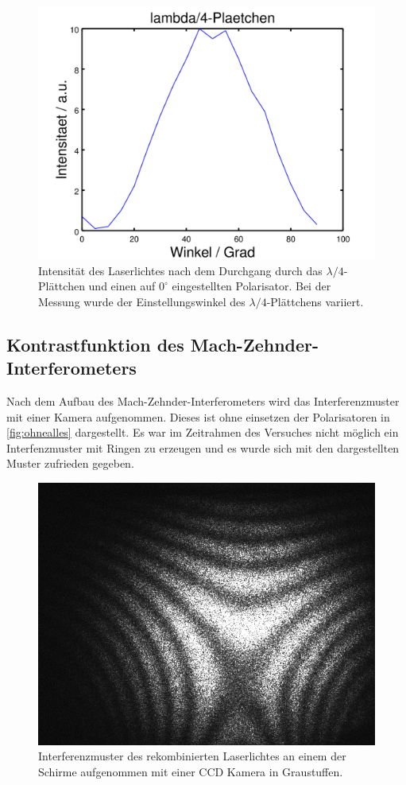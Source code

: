 \documentclass[numbers=noenddot,a4paper,notitlepage,twoside,BCOR15mm]{scrartcl}
\begin{document}
\begin{figure}[h]
	\centering
	\includegraphics[width=0.5\columnwidth]{pics/lambda4.png}
	\caption{Intensität des Laserlichtes nach dem Durchgang durch das $\lambda /4$-Plättchen und einen auf $0^\circ$ eingestellten Polarisator. Bei der Messung wurde der Einstellungswinkel des $\lambda /4$-Plättchens variiert.}
	\label{fig:lambda4}
\end{figure}

\subsection{Kontrastfunktion des Mach-Zehnder-Interferometers}	

Nach dem Aufbau des Mach-Zehnder-Interferometers wird das Interferenzmuster mit einer Kamera aufgenommen. Dieses ist ohne einsetzen der Polarisatoren in \autoref{fig:ohnealles} dargestellt. Es war im Zeitrahmen des Versuches nicht möglich ein Interfenzmuster mit Ringen zu erzeugen und es wurde sich mit den dargestellten Muster zufrieden gegeben. 

\begin{figure}[h]
	\centering
	\includegraphics[width = 0.5 \columnwidth]{pics/ohnealles.png}
	\caption{Interferenzmuster des rekombinierten Laserlichtes an einem der Schirme aufgenommen mit einer CCD Kamera in Graustuffen.}
	\label{fig:ohnealles}
\end{figure}
\end{document}

